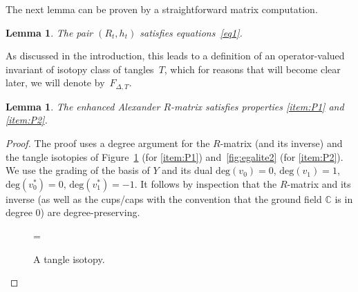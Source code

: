\documentclass[pdftex]{sigma}
\numberwithin{equation}{section}
\newtheorem{Lemma}[Theorem]{Lemma}
\theoremstyle{definition}
\begin{document}
The next lemma can be proven by a straightforward matrix computation.

\begin{Lemma}
\label{lem.alex0}
The pair $(R_t,h_t)$ satisfies equations~\eqref{eq1}.
\end{Lemma}

As discussed in the introduction, this leads to a definition of an operator-valued
invariant of isotopy class of tangles~$T$, which for reasons that will
become clear later, we will denote by~$F_{\Delta,T}$.

\begin{Lemma}
\label{lem.alex1}
The enhanced Alexander $R$-matrix satisfies properties \eqref{item:P1} and
\eqref{item:P2}.
\end{Lemma}

\begin{proof}
The proof uses a degree argument for the $R$-matrix (and its inverse)
and the tangle isotopies of Figure~\ref{fig:egalite} (for \eqref{item:P1})
and~\ref{fig:egalite2} (for \eqref{item:P2}).
We use the grading of the basis of $Y$ {and its dual}
$\mathrm{deg}(v_0) = 0$, $\mathrm{deg}(v_1) = 1$, $\mathrm{deg}(v_0^\ast) = 0$, $\mathrm{deg}(v_1^\ast) = -1$.
It follows by inspection that the $R$-matrix
and its inverse (as well as the cups/caps {with the convention that the ground field $\mathbb{C}$ is in degree $0$}) are degree-preserving.
\begin{figure}[htpb!]
\centering{}
=
\caption{A tangle isotopy.}
\label{fig:egalite}
\end{figure}


\end{proof}
\end{document}
